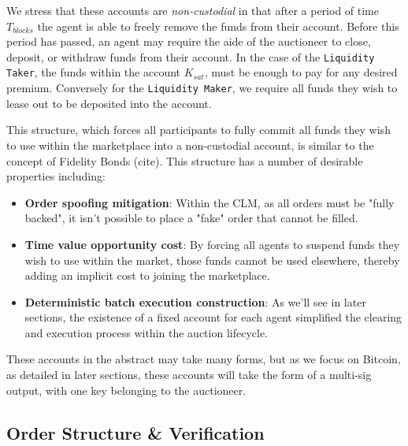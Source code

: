 \documentclass[10pt,a4paper]{article}
\theoremstyle{definition}
\begin{document}
We stress that these accounts are \emph{non-custodial} in that after a period
of time $T_{blocks}$ the agent is able to freely remove the funds from their
account. Before this period has passed, an agent may require the aide of the
auctioneer to close, deposit, or withdraw funds from their account. In the case
of the \texttt{Liquidity Taker}, the funds within the account $K_{sat}$, must
be enough to pay for any desired premium. Conversely for the \texttt{Liquidity
Maker}, we require all funds they wish to lease out to be deposited into the
account. 

This structure, which forces all participants to fully commit all funds they
wish to use within the marketplace into a non-custodial account, is similar to
the concept of Fidelity Bonds (cite). This structure has a number of desirable
properties including:

\begin{itemize} %
    \item \textbf{Order spoofing mitigation}: Within the CLM, as all orders
        must be "fully backed", it isn't possible to place a "fake" order that
        cannot be filled.

    \item \textbf{Time value opportunity cost}: By forcing all agents to
        suspend funds they wish to use within the market, those funds cannot be
        used elsewhere, thereby adding an implicit cost to joining the
        marketplace. 

    \item \textbf{Deterministic batch execution construction}: As we'll see in
        later sections, the existence of a fixed account for each agent
        simplified the clearing and execution process within the auction
        lifecycle. 

\end{itemize}

These accounts in the abstract may take many forms, but as we focus on Bitcoin,
as detailed in later sections, these accounts will take the form of a multi-sig
output, with one key belonging to the auctioneer. 


\subsection{Order Structure \& Verification}
\end{document}

